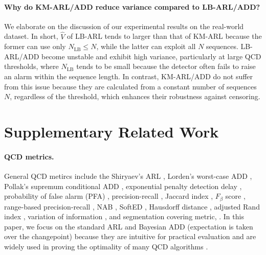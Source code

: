 \documentclass{article}
\theoremstyle{plain}
\theoremstyle{definition}
\theoremstyle{remark}
\begin{document}
\paragraph{Why do KM-ARL/ADD reduce variance compared to LB-ARL/ADD?}
We elaborate on the discussion of our experimental results on the real-world dataset.
In short, $\hat{V}$ of LB-ARL tends to larger than that of KM-ARL because the former can use only $N_{\mathrm{LB}} \leq N$, while the latter can exploit all $N$ sequences.
LB-ARL/ADD become unstable and exhibit high variance, particularly at large QCD thresholds, where $N_{\mathrm{LB}}$ tends to be small because the detector often fails to raise an alarm within the sequence length.
In contrast, KM-ARL/ADD do not suffer from this issue because they are calculated from a constant number of sequences $N$, regardless of the threshold, which enhances their robustness against censoring.

















\clearpage
\section{Supplementary Related Work} \label{app:Supplementary Related Work}
\paragraph{QCD metrics.}
General QCD metircs include
the Shiryaev's ARL \citep{shiryaev1963optimum},
Lorden's worst-case ADD \citep{lorden1971procedures}, 
Pollak's supremum conditional ADD \citep{pollak1985optimal},
exponential penalty detection delay \citep{poor1998quickest},
probability of false alarm (PFA) \citep{tartakovsky2019sequential_TartarBookQCD},
precision-recall \citep{vandenburg2020evaluation}, 
Jaccard index \citep{vandenburg2020evaluation}, 
$F_\beta$ score \citep{vandenburg2020evaluation},
range-based precision-recall \citep{tatbul2018precision},
NAB \citep{alexander2015evaluating_NAB},
SoftED \citep{salles2024softed},
Hausdorff distance \citep{vandenburg2020evaluation},
adjusted Rand index \citep{hubert1985comparing},
variation of information \citep{arabie1973multidimensional},
and 
segmentation covering metric, \citep{everingham2010pascal, arbelaez2010contour}.
In this paper, we focus on the standard ARL and Bayesian ADD (expectation is taken over the changepoint) because they are intuitive for practical evaluation and are widely used in proving the optimality of many QCD algorithms \citep{tartakovsky2019sequential_TartarBookQCD}.
\end{document}
